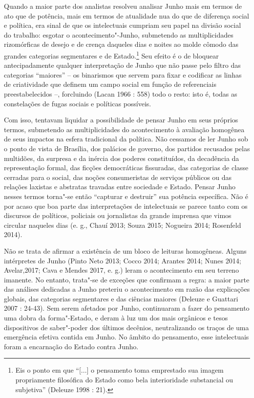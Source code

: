 Quando a maior parte dos analistas
resolveu analisar Junho mais em termos de ato que de potência, mais em
termos de atualidade nua do que de diferença social e política, era
sinal de que os intelectuais cumpriam seu papel na divisão social do
trabalho: esgotar o acontecimento"-Junho, submetendo as multiplicidades
rizomórficas de desejo e de crença daqueles dias e noites ao molde
cômodo das grandes categorias segmentares e de Estado.\footnote{Eis o
  ponto em que ``{[}...{]} o pensamento toma emprestado sua imagem
  propriamente filosófica do Estado como bela interioridade substancial
  ou subjetiva'' (Deleuze 1998 : 21).} Seu efeito é o de bloquear
antecipadamente qualquer interpretação de Junho que não passe pelo
filtro das categorias ``maiores'' -- os binarismos que servem para fixar
e codificar as linhas de criatividade que definem um campo social em
função de referenciais preestabelecidos --, forcluindo (Lacan 1966 :
558) todo o resto: isto é, todas as constelações de fugas sociais e
políticas possíveis.

Com isso, tentavam liquidar a possibilidade de pensar Junho em seus
próprios termos, submetendo as multiplicidades do acontecimento à
avaliação homogênea de seus impactos na esfera tradicional da política.
Não cessamos de ler Junho sob o ponto de vista de Brasília, dos palácios
de governo, dos partidos recusados pelas multidões, da surpresa e da
inércia dos poderes constituídos, da decadência da representação formal,
das ficções democráticas fissuradas, das categorias de classe cerradas
para o social, das noções consumeristas de serviços públicos ou das
relações laxistas e abstratas travadas entre sociedade e Estado. Pensar
Junho nesses termos torna"-se então ``capturar e destruir'' sua potência
específica. Não é por acaso que boa parte das interpretações de
intelectuais se parece tanto com os discursos de políticos, policiais ou
jornalistas da grande imprensa que vimos circular naqueles dias (e. g.,
Chauí 2013; Souza 2015; Nogueira 2014; Rosenfeld 2014).

Não se trata de afirmar a existência de um bloco de leituras homogêneas.
Alguns intérpretes de Junho (Pinto Neto 2013; Cocco 2014; Arantes 2014;
Nunes 2014; Avelar,2017; Cava e Mendes 2017, e. g.) leram o
acontecimento em seu terreno imanente. No entanto, trata"-se de exceções
que confirmam a regra: a maior parte das análises dedicadas a Junho
preteriu o acontecimento em razão das explicações globais, das
categorias segmentares e das ciências maiores (Deleuze e Guattari 2007 :
24-43). Sem serem afetados por Junho, continuaram a fazer do pensamento
uma dobra da forma"-Estado, e deram à luz um dos mais orgânicos e tesos
dispositivos de saber"-poder dos últimos decênios, neutralizando os
traços de uma emergência efetiva contida em Junho. No âmbito do
pensamento, esse intelectuais foram a encarnação do Estado contra Junho.

